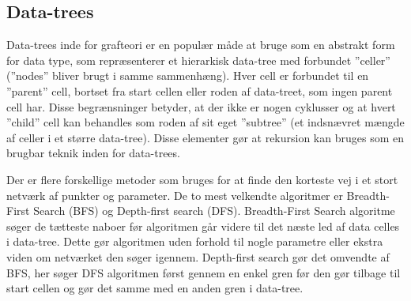 \documentclass[12pt]{article}
\begin{document}
\subsection{Data-trees}
Data-trees inde for grafteori er en populær måde at bruge som en abstrakt form for data type, som repræsenterer et hierarkisk data-tree med forbundet ”celler” (”nodes” bliver brugt i samme sammenhæng). Hver cell er forbundet til en ”parent” cell, bortset fra start cellen eller roden af data-treet, som ingen parent cell har. Disse begrænsninger betyder, at der ikke er nogen cyklusser og at hvert ”child” cell kan behandles som roden af sit eget ”subtree” (et indsnævret  mængde af celler i et større data-tree). Disse elementer gør at rekursion kan bruges som en brugbar teknik inden for data-trees.\\
\begin{figure}[ht]%
  \centering
  \label{fig:datatree}%
\end{figure}
Der er flere forskellige metoder som bruges for at finde den korteste vej i et stort netværk af punkter og parameter. De to mest velkendte algoritmer er Breadth-First Search (BFS) og Depth-first search (DFS). 
Breadth-First Search algoritme søger de tætteste naboer før algoritmen går videre til det næste led af data celles i data-tree. Dette gør algoritmen uden forhold til nogle parametre eller ekstra viden om netværket den søger igennem. Depth-first search gør det omvendte af BFS, her søger DFS algoritmen først gennem en enkel gren før den gør tilbage til start cellen og gør det samme med en anden gren i data-tree. 
\end{document}
